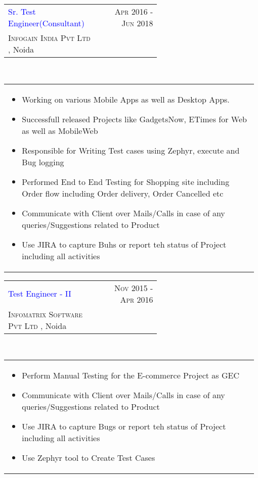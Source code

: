 \documentclass[a4paper]{article} %
\newcommand{\verticalspacing}{-0.25cm}
\newcommand{\bulletspace}{0.7cm}
\newcommand{\projectheadspacing}{6.9cm}
\newcommand{\cproject}[5]{%
    \begin{tabular}{p{0.60\linewidth}r}
        \textcolor{blue}{\small #2} & \multicolumn{1}{m{ \projectheadspacing{} }}{\raggedleft \small {\textsc{#1}}}\\
        \small {#3} & \small {#4}
    \end{tabular}\\
    \begin{tabular}{p{0.98\linewidth}}
    \vspace{-0.3cm}
        \small{#5}
    \end{tabular}
    \vspace{\verticalspacing{}}
}
\begin{document}
\cproject
      {Apr 2016 - Jun 2018}
      {Sr. Test Engineer(Consultant)}
      {\textsc{Infogain India Pvt Ltd }, Noida}
      {}
      {%
        \begin{itemize}[leftmargin=\bulletspace{}]
        \item Working on various Mobile Apps as well as Desktop Apps.
          \item Successfull released Projects like GadgetsNow, ETimes for Web as well as MobileWeb
          \item Responsible for Writing Test cases using Zephyr, execute and Bug logging
          \item Performed End to End Testing for Shopping site including Order flow including Order delivery, Order Cancelled etc
	    \item Communicate with Client over Mails/Calls in case of any queries/Suggestions related to Product
          \item Use JIRA to capture Buhs or report teh status of Project including all activities
        \end{itemize}
  } 

\cproject
      {Nov 2015 - Apr 2016}
      {Test Engineer - II}
      {\textsc{Infomatrix Software Pvt Ltd }, Noida}
      {}
      {%
        \begin{itemize}[leftmargin=\bulletspace{}]
        \item Perform Manual Testing for the E-commerce Project as GEC
         \item Communicate with Client over Mails/Calls in case of any queries/Suggestions related to Product
          \item Use JIRA to capture Bugs or report teh status of Project including all activities
          \item Use Zephyr tool to Create Test Cases
        \end{itemize}
  } 
\end{document}
